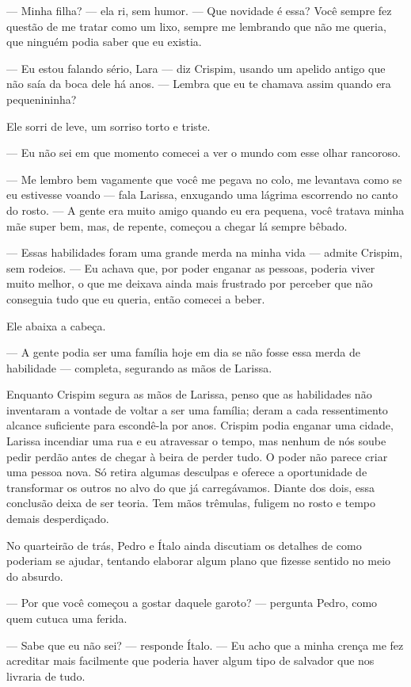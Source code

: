 — Minha filha? — ela ri, sem humor. — Que novidade é essa? Você sempre fez questão de me tratar como um lixo, sempre me lembrando que não me queria, que ninguém podia saber que eu existia.

— Eu estou falando sério, Lara — diz Crispim, usando um apelido antigo que não saía da boca dele há anos. — Lembra que eu te chamava assim quando era pequenininha?

Ele sorri de leve, um sorriso torto e triste.

— Eu não sei em que momento comecei a ver o mundo com esse olhar rancoroso.

— Me lembro bem vagamente que você me pegava no colo, me levantava como se eu estivesse voando — fala Larissa, enxugando uma lágrima escorrendo no canto do rosto. — A gente era muito amigo quando eu era pequena, você tratava minha mãe super bem, mas, de repente, começou a chegar lá sempre bêbado.

— Essas habilidades foram uma grande merda na minha vida — admite Crispim, sem rodeios. — Eu achava que, por poder enganar as pessoas, poderia viver muito melhor, o que me deixava ainda mais frustrado por perceber que não conseguia tudo que eu queria, então comecei a beber.

Ele abaixa a cabeça.

— A gente podia ser uma família hoje em dia se não fosse essa merda de habilidade — completa, segurando as mãos de Larissa.

Enquanto Crispim segura as mãos de Larissa, penso que as habilidades não inventaram a vontade de voltar a ser uma família; deram a cada ressentimento alcance suficiente para escondê-la por anos. Crispim podia enganar uma cidade, Larissa incendiar uma rua e eu atravessar o tempo, mas nenhum de nós soube pedir perdão antes de chegar à beira de perder tudo. O poder não parece criar uma pessoa nova. Só retira algumas desculpas e oferece a oportunidade de transformar os outros no alvo do que já carregávamos. Diante dos dois, essa conclusão deixa de ser teoria. Tem mãos trêmulas, fuligem no rosto e tempo demais desperdiçado.

\bigskip

No quarteirão de trás, Pedro e Ítalo ainda discutiam os detalhes de como poderiam se ajudar, tentando elaborar algum plano que fizesse sentido no meio do absurdo.

— Por que você começou a gostar daquele garoto? — pergunta Pedro, como quem cutuca uma ferida.

— Sabe que eu não sei? — responde Ítalo. — Eu acho que a minha crença me fez acreditar mais facilmente que poderia haver algum tipo de salvador que nos livraria de tudo.


